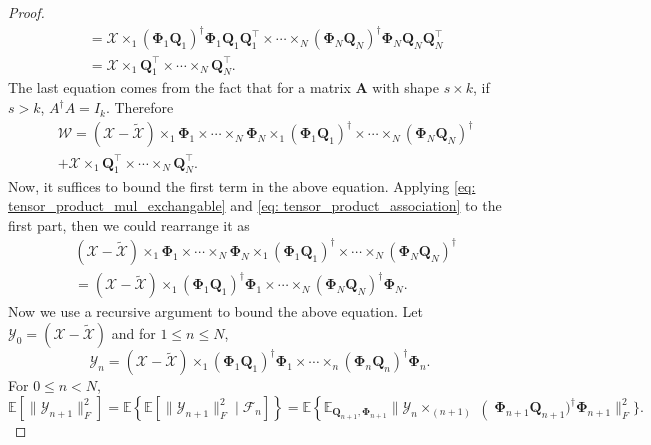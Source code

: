 \begin{lem}
\begin{proof}
\begin{equation}
\begin{aligned}
& = \mathscr{X}\times_1 (\mathbf{\Phi}_1 \mathbf{Q}_1)^\dag \mathbf{\Phi}_1\mathbf{Q}_1\mathbf{Q}_1^\top \times \cdots \times_N (\mathbf{\Phi}_N \mathbf{Q}_N)^\dag \mathbf{\Phi}_N\mathbf{Q}_N\mathbf{Q}_N^\top\\
& = \mathscr{X}\times_1 \mathbf{Q}_1^\top \times \cdots \times_N \mathbf{Q}_N^\top.
\end{aligned}
\end{equation}
The last equation comes from the fact that for a matrix $\mathbf{A}$ with shape $s\times k$, if $s>k$, $A^\dag A = I_k$. Therefore
\begin{equation}
\begin{aligned}
&\mathscr{W} = (\mathscr{X} -  \tilde{\mathscr{X}})\times_1 \mathbf{\Phi}_1 \times \cdots \times_N \mathbf{\Phi}_N  \times_1 (\mathbf{\Phi}_1 \mathbf{Q}_1)^\dag \times \cdots \times_N (\mathbf{\Phi}_N \mathbf{Q}_N)^\dag \\
&+ \mathscr{X}\times_1 \mathbf{Q}_1^\top \times \cdots \times_N \mathbf{Q}_N^\top.
\end{aligned}
\end{equation}
Now, it suffices to bound the first term in the above equation. Applying \eqref{eq: tensor_product_mul_exchangable} and \eqref{eq: tensor_product_association} to the first part, then we could rearrange it as
\begin{equation}
\begin{aligned}
&(\mathscr{X} -  \tilde{\mathscr{X}})\times_1 \mathbf{\Phi}_1 \times \cdots \times_N \mathbf{\Phi}_N  \times_1 (\mathbf{\Phi}_1 \mathbf{Q}_1)^\dag \times \cdots \times_N (\mathbf{\Phi}_N \mathbf{Q}_N)^\dag \\
& =(\mathscr{X} -  \tilde{\mathscr{X}})\times_1 (\mathbf{\Phi}_1\mathbf{Q}_1)^\dag \mathbf{\Phi}_1 \times \cdots \times_N (\mathbf{\Phi}_N\mathbf{Q}_N)^\dag \mathbf{\Phi}_N.
\end{aligned}
\end{equation}
Now we use a recursive argument to bound the above equation. Let 
$\mathscr{Y}_0 = (\mathscr{X} -  \tilde{\mathscr{X}})$ and for $1\le n \le N$, 
\begin{equation}
\mathscr{Y}_n =  (\mathscr{X} -  \tilde{\mathscr{X}})\times_1 (\mathbf{\Phi}_1\mathbf{Q}_1)^\dag \mathbf{\Phi}_1 \times \cdots \times_n (\mathbf{\Phi}_n\mathbf{Q}_n)^\dag \mathbf{\Phi}_n.
\end{equation}
For $0\le n<N$, 
\begin{equation}
\label{eq:recursion}
\mathbb{E} [\|\mathscr{Y}_{n+1}\|_F^2] = \mathbb{E}\left\{ \mathbb{E} [\|\mathscr{Y}_{n+1}\|_F^2 \mid \mathcal{F}_n] \right\} = \mathbb{E} \left\{\mathbb{E}_{\mathbf{Q}_{n+1}, \mathbf{\Phi}_{n+1}}  \|\mathscr{Y}_n\times_{(n+1)}\right (\mathbf{\Phi}_{n+1}\mathbf{Q}_{n+1})^\dag \mathbf{\Phi}_{n+1}\|_F^2\}. 

\end{equation}
\end{proof}
\end{lem}
